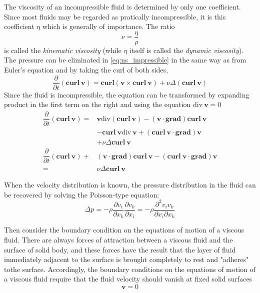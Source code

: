 \documentclass[conference]{IEEEtran}
\theoremstyle{definition}
\theoremstyle{remark}
\begin{document}
    The viscosity of an incompressible fluid is determined by only one coefficient. Since most fluids may be regarded as pratically incompressible, it is this coefficient $\eta$ which is generally of importance. The ratio
    \[
        \nu = \dfrac{\eta}{\rho}
    \]
    is called the \emph{kinematic viscosity} (while $\eta$ itself is called the \emph{dynamic viscosity}). The pressure can be eliminated in \ref{eq:ns_impressible} in the same way as from Euler's equation and by taking the curl of both sides, 
    \[
        \dfrac{\partial}{\partial t} (\textbf{curl} \ \mathbf{v}) = \textbf{curl} (\mathbf{v} \times \textbf{curl} \ \mathbf{v}) + \nu \Delta (\textbf{curl} \  \mathbf{v})
    \]
    Since the fluid is incompressible, the equation can be transformed by expanding product in the first term on the right and using the equation $\text{div} \ \mathbf{v} = 0$
    \begin{align}
        \dfrac{\partial}{\partial t} (\textbf{curl} \ \mathbf{v}) =& \mathbf{v} \text{div} (\textbf{curl}\ \mathbf{v}) - (\mathbf{v}\cdot \textbf{grad}) \textbf{curl} \ \mathbf{v} \nonumber \\
        &- \textbf{curl} \ \mathbf{v} \text{div} \ \mathbf{v} + (\textbf{curl} \ \mathbf{v} \cdot \textbf{grad}) \mathbf{v} \nonumber \\
        &+ \nu \Delta \textbf{curl} \ \mathbf{v} \nonumber \\
        \dfrac{\partial}{\partial t} (\textbf{curl} \ \mathbf{v}) +& (\mathbf{v}\cdot \textbf{grad}) \textbf{curl} \ \mathbf{v} - (\textbf{curl} \ \mathbf{v} \cdot \textbf{grad}) \mathbf{v} \nonumber \\
        =& \nu \Delta \textbf{curl} \ \mathbf{v}
    \end{align}

    When the velocity distribution is known, the pressure distribution in the fluid can be recovered by solving the Poisson-type equation:
    \begin{equation}
        \Delta p = -\rho \dfrac{\partial v_i}{\partial x_k} \dfrac{\partial v_k}{\partial x_i} = -\rho \dfrac{\partial^2 v_iv_k}{\partial x_i \partial x_k}
    \end{equation}

    Then consider the boundary condition on the equations of motion of a viscous fluid. There are always forces of attraction between a viscous fluid and the surface of solid body, and these forces have the result that the layer of fluid immediately adjacent to the surface is brought completely to rest and "adheres" tothe surface. Accordingly, the boundary conditions on the equations of motion of a viscous fluid require that the fluid velocity should vanish at fixed solid surfaces
    \begin{equation}
        \mathbf{v} = 0
    \end{equation}
\end{document}
